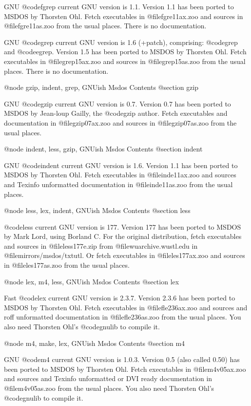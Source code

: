 GNU @code{fgrep} current GNU version is 1.1.  Version 1.1 has been
ported to MSDOS by Thorsten Ohl.  Fetch executables in
@file{fgre11ax.zoo} and sources in @file{fgre11as.zoo} from the usual
places.  There is no documentation.

GNU @code{grep} current GNU version is 1.6 (+patch), comprising:
@code{grep} and @code{egrep}.  Version 1.5 has been ported to MSDOS by
Thorsten Ohl.  Fetch executables in @file{grep15ax.zoo} and sources in
@file{grep15as.zoo} from the usual places.  There is no documentation.

@node gzip, indent, grep, GNUish Msdos Contents
@section gzip

GNU @code{gzip} current GNU version is 0.7.  Version 0.7 has been ported
to MSDOS by Jean-loup Gailly, the @code{gzip} author.  Fetch executables
and documentation in @file{gzip07ax.zoo} and sources in
@file{gzip07as.zoo} from the usual places.

@node indent, less, gzip, GNUish Msdos Contents
@section indent

GNU @code{indent} current GNU version is 1.6.  Version 1.1 has been
ported to MSDOS by Thorsten Ohl.  Fetch executables in
@file{inde11ax.zoo} and sources and Texinfo unformatted documentation in
@file{inde11as.zoo} from the usual places.

@node less, lex, indent, GNUish Msdos Contents
@section less

@code{less} current GNU version is 177.  Version 177 has been ported to
MSDOS by Mark Lord, using Borland C.  For the original distribution,
fetch executables and sources in @file{less177e.zip} from
@file{wuarchive.wustl.edu} in @file{mirrors/msdos/txtutl}. Or fetch
executables in @file{les177ax.zoo} and sources in @file{les177as.zoo}
from the usual places.

@node lex, m4, less, GNUish Msdos Contents
@section lex

Fast @code{lex} current GNU version is 2.3.7.  Version 2.3.6 has been
ported to MSDOS by Thorsten Ohl.  Fetch executables in
@file{fle236ax.zoo} and sources and roff unformatted documentation in
@file{fle236as.zoo} from the usual places.  You also need Thorsten Ohl's
@code{gnulib} to compile it.

@node m4, make, lex, GNUish Msdos Contents
@section m4

GNU @code{m4} current GNU version is 1.0.3.  Version 0.5 (also called
0.50) has been ported to MSDOS by Thorsten Ohl.  Fetch executables in
@file{m4v05ax.zoo} and sources and Texinfo unformatted or DVI ready
documentation in @file{m4v05as.zoo} from the usual places.  You also
need Thorsten Ohl's @code{gnulib} to compile it.

